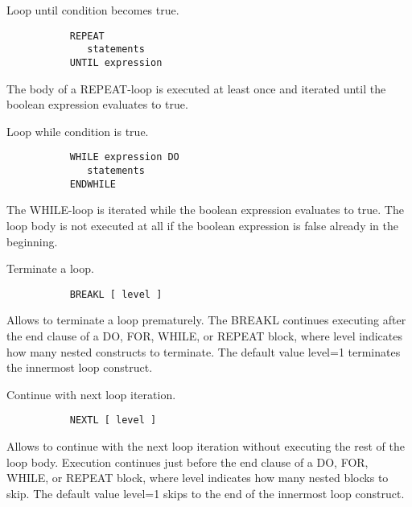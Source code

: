 \ENDCMD


   \par
Loop until condition becomes true.  

\begin{verbatim}
           REPEAT
              statements
           UNTIL expression
\end{verbatim}
\ENDVERB
   \par
The body of a REPEAT-loop is executed at least once and iterated until the 
   boolean expression evaluates to true.  

\ENDCMD


   \par
Loop while condition is true.  

\begin{verbatim}
           WHILE expression DO
              statements
           ENDWHILE
\end{verbatim}
\ENDVERB
   \par
The WHILE-loop is iterated while the boolean expression evaluates to true. 
   The loop body is not executed at all if the boolean expression is false 
   already in the beginning.  

\ENDCMD


   \par
Terminate a loop.  

\begin{verbatim}
           BREAKL [ level ]
\end{verbatim}
\ENDVERB
   \par
Allows to terminate a loop prematurely. The BREAKL continues executing 
   after the end clause of a DO, FOR, WHILE, or REPEAT block, where 
   \DQUOTE{}level\DQUOTE{} indicates how many nested constructs to terminate.  
   The default value level=1 terminates the innermost loop construct.  

\ENDCMD


   \par
Continue with next loop iteration.  

\begin{verbatim}
           NEXTL [ level ]
\end{verbatim}
\ENDVERB
   \par
Allows to continue with the next loop iteration without executing the rest 
   of the loop body.  Execution continues just before the end clause of a DO, 
   FOR, WHILE, or REPEAT block, where \DQUOTE{}level\DQUOTE{} indicates how 
   many nested blocks to skip.  The default value level=1 skips to the end of 
   the innermost loop construct.  

